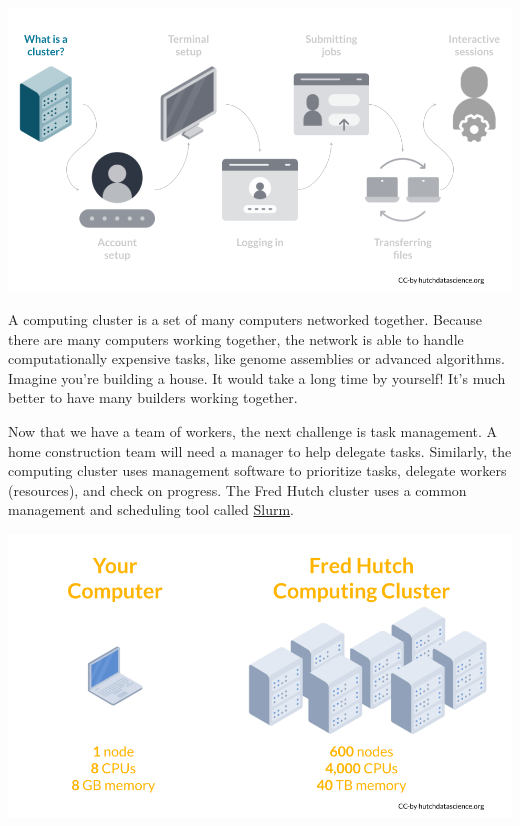 \documentclass[
]{book}
\begin{document}
\begin{center}\includegraphics[width=0.8\linewidth]{resources/images/01-cluster_files/figure-latex//1BQxrVYdKZTbpCaF-i_q9w7s9x034lEXpQZDU-Sl09cs_gff2211b72f_1_114} \end{center}

A computing cluster is a set of many computers networked together. Because there are many computers working together, the network is able to handle computationally expensive tasks, like genome assemblies or advanced algorithms. Imagine you're building a house. It would take a long time by yourself! It's much better to have many builders working together.

Now that we have a team of workers, the next challenge is task management. A home construction team will need a manager to help delegate tasks. Similarly, the computing cluster uses management software to prioritize tasks, delegate workers (resources), and check on progress. The Fred Hutch cluster uses a common management and scheduling tool called \href{https://slurm.schedmd.com/overview.html}{Slurm}.

\begin{center}\includegraphics[width=0.8\linewidth]{resources/images/01-cluster_files/figure-latex//1BQxrVYdKZTbpCaF-i_q9w7s9x034lEXpQZDU-Sl09cs_g149d37dd4a1_0_18} \end{center}
\end{document}
